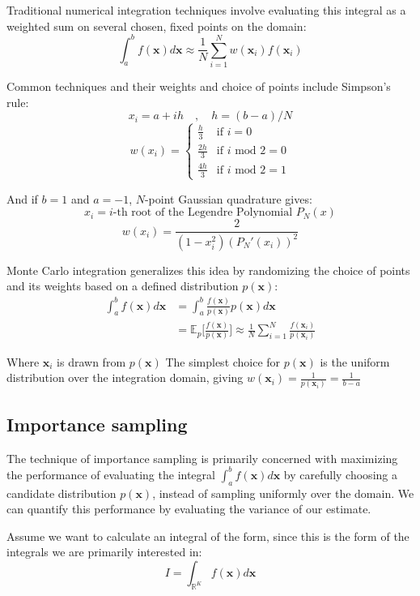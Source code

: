 Traditional numerical integration techniques involve evaluating this integral as a weighted sum on several chosen, fixed points on the domain:
\[\int_a^b f(\mathbf{x}) d \mathbf{x} \approx \frac{1}{N} \sum_{i=1}^N w(\mathbf{x}_i) f(\mathbf{x}_i)\]

Common techniques and their weights and choice of points include Simpson's rule:
\[x_i = a + ih \quad , \quad h = (b-a)/N \] 
\[ w(x_i) = \begin{cases} \frac{h}{3} & \text{if } i=0 \\  \frac{2h}{3} & \text{if } i \text{ mod } 2=0 \\ \frac{4h}{3} & \text{if } i \text{ mod } 2=1   \end{cases} \]

And if \(b=1\) and \(a=-1\), \(N\)-point Gaussian quadrature gives:
\[x_i = i\text{-th root of the Legendre Polynomial } P_N(x)\]
\[w(x_i) = \frac{2}{(1-x_i^2)(P_N'(x_i))^2}\]

Monte Carlo integration generalizes this idea by randomizing the choice of points and its weights based on a defined distribution \(p(\mathbf{x})\):
\begin{equation*}
\begin{split}
   \int_a^b f(\mathbf{x}) d \mathbf{x} &= \int_a^b \frac{f(\mathbf{x})}{p(\mathbf{x})} p(\mathbf{x}) d \mathbf{x}  \\
   &= \mathbb{E}_p\bigg[ \frac{f(\mathbf{x})}{p(\mathbf{x})} \bigg] \approx \frac{1}{N} \sum_{i=1} ^ N \frac{f(\mathbf{x}_i)}{p(\mathbf{x}_i)}
\end{split}
\end{equation*}

Where \(\mathbf{x}_i\) is drawn from \(p(\mathbf{x})\) The simplest choice for \(p(\mathbf{x})\) is the uniform distribution over the integration domain, giving \(w(\mathbf{x}_i) = \frac{1}{p(\mathbf{x}_i)}= \frac{1}{b-a}\)

\subsection{Importance sampling}
The technique of importance sampling is primarily concerned with maximizing the performance of evaluating the integral \(\int_a^b f(\mathbf{x}) d \mathbf{x}\) by carefully choosing a candidate distribution \(p(\mathbf{x})\), instead of sampling uniformly over the domain. We can quantify this performance by evaluating the variance of our estimate.

Assume we want to calculate an integral of the form, since this is the form of the integrals we are primarily interested in:
\[ I = \int_{\mathbb{R}^K} f(\mathbf{x}) d \mathbf{x} \]

